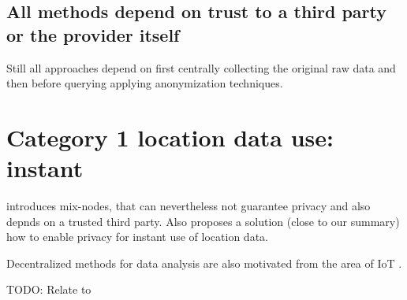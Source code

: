 \subsection{All methods depend on trust to a third party or the provider itself}
Still all approaches depend on first centrally collecting the original raw data and then before querying \parencite{k-anonymity} applying anonymization techniques.

\section{Category 1 location data use: instant}
\parencite{location-privacy, mix-zones} introduces mix-nodes, that can nevertheless not guarantee privacy and also depnds on a trusted third party.
		Also \parencite{casper} proposes a solution (close to our summary) how to enable privacy for instant use of location data.

Decentralized methods for data analysis are also motivated from the area of IoT \parencite{iot}.

TODO: Relate to \parencite{k-anonymity}

